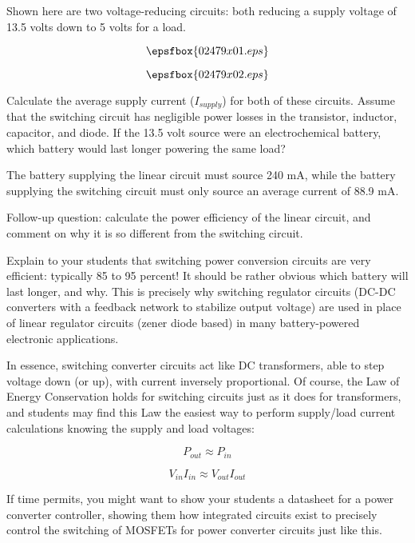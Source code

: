 

Shown here are two voltage-reducing circuits: both reducing a supply voltage of 13.5 volts down to 5 volts for a load.

$$\epsfbox{02479x01.eps}$$

$$\epsfbox{02479x02.eps}$$

Calculate the average supply current ($I_{supply}$) for both of these circuits.  Assume that the switching circuit has negligible power losses in the transistor, inductor, capacitor, and diode.  If the 13.5 volt source were an electrochemical battery, which battery would last longer powering the same load?







The battery supplying the linear circuit must source 240 mA, while the battery supplying the switching circuit must only source an average current of 88.9 mA.

\vskip 10pt

Follow-up question: calculate the power efficiency of the linear circuit, and comment on why it is so different from the switching circuit.







Explain to your students that switching power conversion circuits are very efficient: typically 85 to 95 percent!  It should be rather obvious which battery will last longer, and why.  This is precisely why switching regulator circuits (DC-DC converters with a feedback network to stabilize output voltage) are used in place of linear regulator circuits (zener diode based) in many battery-powered electronic applications.

In essence, switching converter circuits act like DC transformers, able to step voltage down (or up), with current inversely proportional.  Of course, the Law of Energy Conservation holds for switching circuits just as it does for transformers, and students may find this Law the easiest way to perform supply/load current calculations knowing the supply and load voltages:

$$P_{out} \approx P_{in}$$

$$V_{in}I_{in} \approx V_{out}I_{out}$$

If time permits, you might want to show your students a datasheet for a power converter controller, showing them how integrated circuits exist to precisely control the switching of MOSFETs for power converter circuits just like this.




